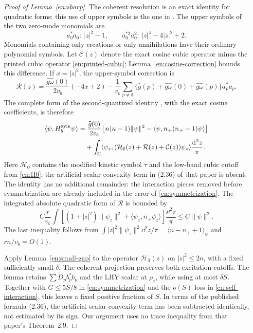 \begin{proof}[Proof of Lemma~\ref{en:sharp}]
The coherent resolution is an exact identity for quadratic forms; this
use of upper symbols is the one in \cite{LSY2005}.
The upper symbols of the two zero-mode monomials are
\begin{equation}\label{en:upper-symbols}
 a_0^*a_0:\ |z|^2-1,\qquad
 a_0^{*2}a_0^2:\ |z|^4-4|z|^2+2.
\end{equation}
Monomials containing only creations or only annihilations have their
ordinary polynomial symbols.  Let $\mathcal C(z)$ denote the exact
cosine cubic operator minus the printed cubic operator
\eqref{en:printed-cubic}; Lemma~\ref{en:cosine-correction} bounds this
difference.  If $x=|z|^2$, the upper-symbol correction is
\begin{equation}\label{en:symbol-error}
 \mathcal R(z)=\frac{\widehat{g\omega}(0)}{2v_b}(-4x+2)
 -\frac1{v_b}\sum_{p\ne0}
  \{\widehat g(p)+\widehat{g\omega}(0)+\widehat{g\omega}(p)\}a_p^*a_p.
\end{equation}
The complete form of the second-quantized identity
\cite[Lemma~2.8, Equation~(2.33)]{FJGMOT}, with the exact cosine
coefficients, is therefore
\begin{align}
 \langle\psi,H_b^{\rm sym}\psi\rangle
 &=\frac{\widehat g(0)}{2v_b}
       \left[n(n-1)\|\psi\|^2
                     -\langle\psi,n_+(n_+-1)\psi\rangle\right]
       \nonumber\\
 &\quad+\int_{\mathbb C}
       \langle\psi_z,
          (\mathcal H_0(z)+\mathcal R(z)+\mathcal C(z))\psi_z\rangle
                                      \frac{\mathrm d^2z}{\pi}.
 \label{en:coherent-Hsym-identity}
\end{align}
Here $\mathcal H_0$ contains the modified kinetic symbol $\tau$ and
the low-band cubic cutoff from \eqref{en:H0}; the artificial scalar
convexity term in (2.36) of that paper is absent.  The identity has no
additional remainder: the interaction pieces removed before
symmetrization are already included in the error of
\eqref{en:symmetrization}.
The integrated absolute quadratic form of $\mathcal R$ is bounded by
\[
 C\frac r{v_b}\int\left[
       (1+|z|^2)\|\psi_z\|^2+\langle\psi_z,n_+\psi_z\rangle\right]
                                    \frac{\dd^2z}{\pi}
 \le C\|\psi\|^2.
\]
The last inequality follows from
$\int|z|^2\|\psi_z\|^2\dd^2z/\pi
=\langle n-n_++1\rangle_\psi$ and $rn/v_b=O(1)$.

Apply Lemma~\ref{en:small-gap} to the operator
$\mathcal H_0(z)$ on $|z|^2\le2n$, with a fixed sufficiently small
$\delta$.  The coherent projection preserves both excitation cutoffs.
The lemma retains $\sum\widetilde D_pb_p^*b_p$ and the LHY scalar at
$\rho_z$, while using at most $\delta S$.  Together with
$G\le5S/8$ in \eqref{en:symmetrization} and the $o(S)$ loss in
\eqref{en:self-interaction}, this leaves a fixed positive fraction of
$S$.  In terms of the published formula (2.36), the artificial scalar
convexity term has been subtracted identically, not estimated by its
sign.  Our argument uses no trace inequality from that paper's
Theorem~2.9.


\end{proof}
